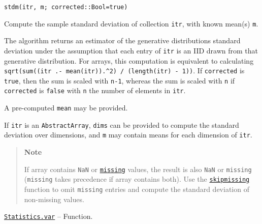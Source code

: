 \begin{adjustwidth}{2em}{0pt}


\begin{verbatim}
stdm(itr, m; corrected::Bool=true)
\end{verbatim}

Compute the sample standard deviation of collection \texttt{itr}, with known mean(s) \texttt{m}.

The algorithm returns an estimator of the generative distribution{\textquotesingle}s standard deviation under the assumption that each entry of \texttt{itr} is an IID drawn from that generative distribution. For arrays, this computation is equivalent to calculating \texttt{sqrt(sum((itr .- mean(itr)).{\textasciicircum}2) / (length(itr) - 1))}. If \texttt{corrected} is \texttt{true}, then the sum is scaled with \texttt{n-1}, whereas the sum is scaled with \texttt{n} if \texttt{corrected} is \texttt{false} with \texttt{n} the number of elements in \texttt{itr}.

A pre-computed \texttt{mean} may be provided.

If \texttt{itr} is an \texttt{AbstractArray}, \texttt{dims} can be provided to compute the standard deviation over dimensions, and \texttt{m} may contain means for each dimension of \texttt{itr}.

\begin{quote}
\textbf{Note}

If array contains \texttt{NaN} or \hyperlink{14596725676261444434}{\texttt{missing}} values, the result is also \texttt{NaN} or \texttt{missing} (\texttt{missing} takes precedence if array contains both). Use the \hyperlink{2012470681884771400}{\texttt{skipmissing}} function to omit \texttt{missing} entries and compute the standard deviation of non-missing values.

\end{quote}


\end{adjustwidth}
\hypertarget{3113715888143479678}{} 
\hyperlink{3113715888143479678}{\texttt{Statistics.var}}  -- {Function.}

